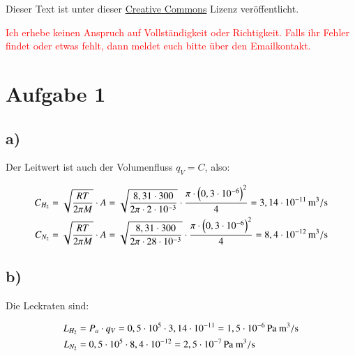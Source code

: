 




\maketitle

Dieser Text ist unter dieser \href{http://creativecommons.org/licenses/by-nc-sa/4.0/}{Creative Commons} Lizenz veröffentlicht.

\textcolor{red}{Ich erhebe keinen Anspruch auf Vollständigkeit oder Richtigkeit. Falls ihr Fehler findet oder etwas fehlt, dann meldet euch bitte über den Emailkontakt.}

\tableofcontents


\newpage



\section{Aufgabe 1}

\subsection*{a)}

Der Leitwert ist auch der Volumenfluss $q_V = C$, also:

\begin{align*}
C_{H_2} &= \sqrt{\frac{RT}{2 \pi M}} \cdot A = \sqrt{\frac{8,31 \cdot 300}{2 \pi \cdot 2 \cdot 10^{-3}}} \cdot \frac{\pi \cdot \left( 0,3 \cdot 10^{-6} \right)^2}{4} = \unit[3,14 \cdot 10^{-11}]{m^3/s} \\
C_{N_2} &= \sqrt{\frac{RT}{2 \pi M}} \cdot A = \sqrt{\frac{8,31 \cdot 300}{2 \pi \cdot 28 \cdot 10^{-3}}} \cdot \frac{\pi \cdot \left( 0,3 \cdot 10^{-6} \right)^2}{4} = \unit[8,4 \cdot 10^{-12}]{m^3/s}
\end{align*}


\subsection*{b)}

Die Leckraten sind:

\begin{align*}
L_{H_2} &= P_a \cdot q_V = 0,5 \cdot 10^5 \cdot 3,14 \cdot 10^{-11} = \unit[1,5 \cdot 10^{-6}]{Pa \ m^3 /s} \\
L_{N_2} &= 0,5 \cdot 10^5 \cdot 8,4 \cdot 10^{-12} = \unit[2,5 \cdot 10^{-7}]{Pa \ m^3 /s}
\end{align*}


